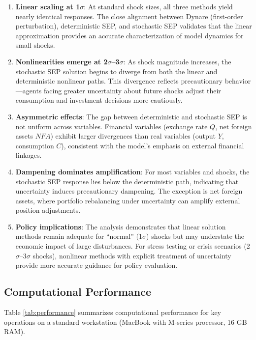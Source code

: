 \documentclass[12pt]{article}
\begin{document}
\begin{enumerate}
\item \textbf{Linear scaling at 1$\sigma$}: At standard shock sizes, all three methods yield nearly identical responses. The close alignment between Dynare (first-order perturbation), deterministic SEP, and stochastic SEP validates that the linear approximation provides an accurate characterization of model dynamics for small shocks.

\item \textbf{Nonlinearities emerge at 2$\sigma$--3$\sigma$}: As shock magnitude increases, the stochastic SEP solution begins to diverge from both the linear and deterministic nonlinear paths. This divergence reflects precautionary behavior---agents facing greater uncertainty about future shocks adjust their consumption and investment decisions more cautiously.

\item \textbf{Asymmetric effects}: The gap between deterministic and stochastic SEP is not uniform across variables. Financial variables (exchange rate $Q$, net foreign assets $NFA$) exhibit larger divergences than real variables (output $Y$, consumption $C$), consistent with the model's emphasis on external financial linkages.

\item \textbf{Dampening dominates amplification}: For most variables and shocks, the stochastic SEP response lies below the deterministic path, indicating that uncertainty induces precautionary dampening. The exception is net foreign assets, where portfolio rebalancing under uncertainty can amplify external position adjustments.

\item \textbf{Policy implications}: The analysis demonstrates that linear solution methods remain adequate for ``normal'' (1$\sigma$) shocks but may understate the economic impact of large disturbances. For stress testing or crisis scenarios (2$\sigma$--3$\sigma$ shocks), nonlinear methods with explicit treatment of uncertainty provide more accurate guidance for policy evaluation.
\end{enumerate}

\subsection{Computational Performance}

Table \ref{tab:performance} summarizes computational performance for key operations on a standard workstation (MacBook with M-series processor, 16 GB RAM).
\end{document}
